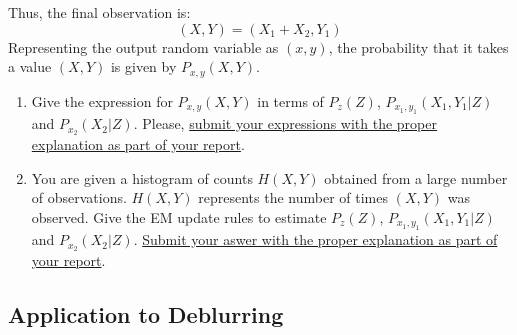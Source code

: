 Thus, the final observation is:
$$(X,Y) =  (X_1 + X_2, Y_1)$$
Representing the output random variable as $(x,y)$, the probability that it takes a value $(X,Y)$ is given by $P_{x,y}(X,Y)$.


\begin{enumerate}
    \item Give the expression for $P_{x,y}(X,Y)$ in terms of $P_z(Z)$, $P_{x_1,y_1}(X_1,Y_1|Z)$ and  $P_{x_2}(X_2|Z)$. Please, \ul{submit your expressions with the proper explanation as part of your report}.
    \item You are given a histogram of counts $H(X,Y)$ obtained from a large number of observations.  $H(X,Y)$ represents the number of times  $(X,Y)$ was observed. Give the EM update rules to estimate $P_z(Z)$, $P_{x_1,y_1}(X_1,Y_1|Z)$ and  $P_{x_2}(X_2|Z)$. \ul{Submit your aswer with the proper explanation as part of your report}.

\end{enumerate}
 


\subsection{Application to Deblurring }


